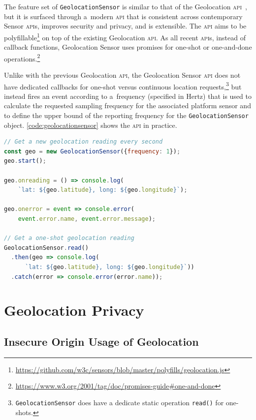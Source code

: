 \documentclass[sigconf,hyphens]{acmart}
\begin{document}
The feature set of \texttt{GeolocationSensor} is similar
to that of the Geolocation \textsc{api}~\cite{raskin2010geolocation},
but it is surfaced through a~modern \textsc{api} that is consistent across contemporary Sensor \textsc{api}s,
improves security and privacy, and is extensible.
The \textsc{api} aims to be
polyfillable\footnote{\url{https://github.com/w3c/sensors/blob/master/polyfills/geolocation.js}}
on top of the existing Geolocation \textsc{api}.
As all recent \textsc{api}s, instead of callback functions, Geolocation Sensor
uses promises for one-shot or one-and-done
operations.\footnote{\url{https://www.w3.org/2001/tag/doc/promises-guide\#one-and-done}}

Unlike with the previous Geolocation \textsc{api}, the Geolocation Sensor \textsc{api}
does not have dedicated callbacks for
one-shot versus continuous location
requests,\footnote{\texttt{GeolocationSensor} does have a dedicate static operation
\texttt{read()} for one-shots.}
but instead fires an event according to a~frequency (specified in Hertz) that is used
to calculate the requested sampling frequency for the associated platform sensor
and to define the upper bound of the reporting frequency for the \texttt{GeolocationSensor}
object.
\autoref{code:geolocationsensor} shows the \textsc{api} in practice.

\begin{lstlisting}[caption={Geolocation Sensor \textsc{api}},
  label=code:geolocationsensor, language=JavaScript, float=t] 
// Get a new geolocation reading every second
const geo = new GeolocationSensor({frequency: 1});
geo.start();

geo.onreading = () => console.log(
    `lat: ${geo.latitude}, long: ${geo.longitude}`);

geo.onerror = event => console.error(
    event.error.name, event.error.message);

// Get a one-shot geolocation reading
GeolocationSensor.read()
  .then(geo => console.log(
      `lat: ${geo.latitude}, long: ${geo.longitude}`))
  .catch(error => console.error(error.name));
\end{lstlisting}

\section{Geolocation Privacy}

\subsection{Insecure Origin Usage of Geolocation}
\end{document}
